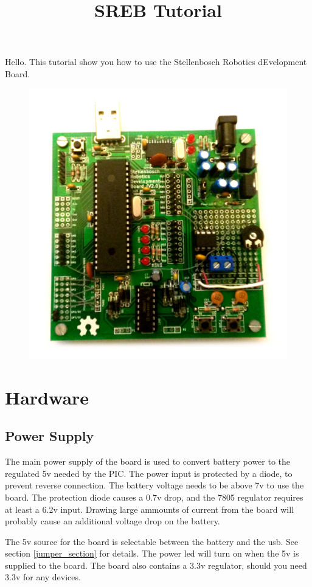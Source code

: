 \documentclass{article}
\title {SREB Tutorial}
\begin{document}
\maketitle
Hello. This tutorial show you how to use the Stellenbosch Robotics dEvelopment Board.
\begin{figure}[h!]
	\centering
    \includegraphics[scale=0.21]{full_board.jpg}
\end{figure}
\section{Hardware}
\subsection{Power Supply}
The main power supply of the board is used to convert battery power to the regulated 5v needed by the PIC. The power input is protected by a diode, to prevent reverse connection. The battery voltage needs to be above 7v to use the board. The protection diode causes a 0.7v drop, and the 7805 regulator requires at least a 6.2v input. Drawing large ammounts of  current from the board will probably cause an additional voltage drop on the battery.

The 5v source for the board is selectable between the battery and the usb. See section \ref{jumper_section} for details. The power led will turn on when the 5v is supplied to the board. The board also contains a 3.3v regulator, should you need 3.3v for any devices.
\end{document}
